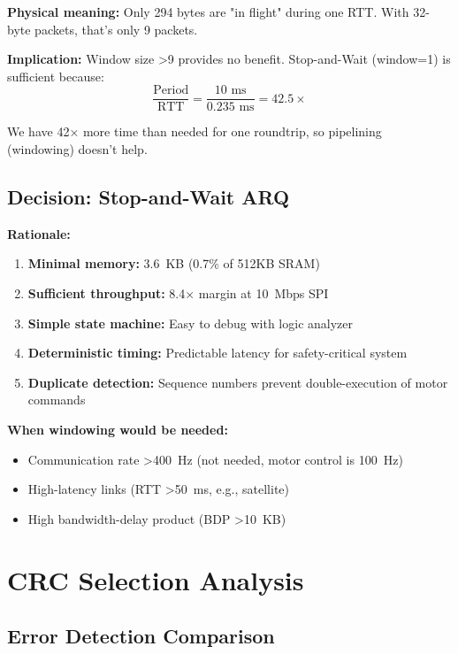 \textbf{Physical meaning:} Only 294 bytes are "in flight" during one RTT. With 32-byte packets, that's only 9 packets.

\textbf{Implication:} Window size >9 provides no benefit. Stop-and-Wait (window=1) is sufficient because:
\begin{equation}
\frac{\text{Period}}{\text{RTT}} = \frac{10 \text{ ms}}{0.235 \text{ ms}} = 42.5×
\end{equation}

We have 42× more time than needed for one roundtrip, so pipelining (windowing) doesn't help.

\subsection{Decision: Stop-and-Wait ARQ}

\textbf{Rationale:}
\begin{enumerate}
    \item \textbf{Minimal memory:} 3.6~KB (0.7\% of 512KB SRAM)
    \item \textbf{Sufficient throughput:} 8.4× margin at 10~Mbps SPI
    \item \textbf{Simple state machine:} Easy to debug with logic analyzer
    \item \textbf{Deterministic timing:} Predictable latency for safety-critical system
    \item \textbf{Duplicate detection:} Sequence numbers prevent double-execution of motor commands
\end{enumerate}

\textbf{When windowing would be needed:}
\begin{itemize}
    \item Communication rate >400~Hz (not needed, motor control is 100~Hz)
    \item High-latency links (RTT >50~ms, e.g., satellite)
    \item High bandwidth-delay product (BDP >10~KB)
\end{itemize}

\section{CRC Selection Analysis}

\subsection{Error Detection Comparison}

